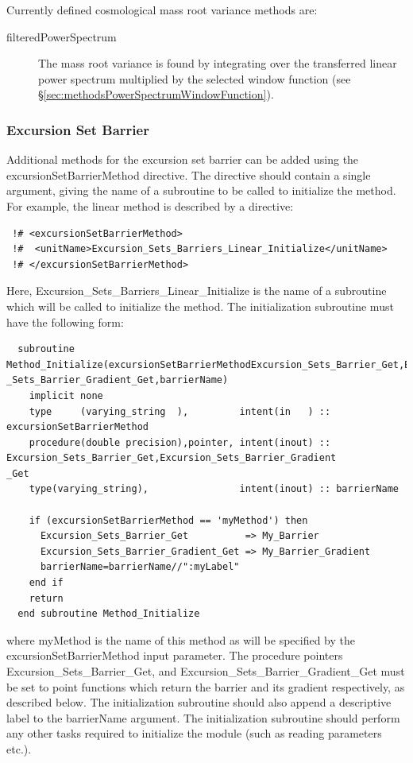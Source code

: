 Currently defined cosmological mass root variance methods are:
\begin{description}
 \item [{\normalfont \ttfamily filteredPowerSpectrum}] The mass root variance is found by integrating over the transferred linear power spectrum multiplied by the selected window function (see \S\ref{sec:methodsPowerSpectrumWindowFunction}).
\end{description}

\subsubsection{Excursion Set Barrier}\label{sec:excursionSetBarrierMethod}

Additional methods for the excursion set barrier can be added using the {\normalfont \ttfamily excursionSetBarrierMethod} directive. The directive should contain a single argument, giving the name of a subroutine to be called to initialize the method. For example, the {\normalfont \ttfamily linear} method is described by a directive:
\begin{verbatim}
 !# <excursionSetBarrierMethod>
 !#  <unitName>Excursion_Sets_Barriers_Linear_Initialize</unitName>
 !# </excursionSetBarrierMethod>
\end{verbatim}
Here, {\normalfont \ttfamily Excursion\_Sets\_Barriers\_Linear\_Initialize} is the name of a subroutine which will be called to initialize the method. The initialization subroutine must have the following form:
\begin{verbatim}
  subroutine Method_Initialize(excursionSetBarrierMethodExcursion_Sets_Barrier_Get,Excursion
_Sets_Barrier_Gradient_Get,barrierName)
    implicit none
    type     (varying_string  ),         intent(in   ) :: excursionSetBarrierMethod
    procedure(double precision),pointer, intent(inout) :: Excursion_Sets_Barrier_Get,Excursion_Sets_Barrier_Gradient
_Get
    type(varying_string),                intent(inout) :: barrierName

    if (excursionSetBarrierMethod == 'myMethod') then
      Excursion_Sets_Barrier_Get          => My_Barrier
      Excursion_Sets_Barrier_Gradient_Get => My_Barrier_Gradient
      barrierName=barrierName//":myLabel"
    end if
    return
  end subroutine Method_Initialize
\end{verbatim}
where {\normalfont \ttfamily myMethod} is the name of this method as will be specified by the {\normalfont \ttfamily excursionSetBarrierMethod} input parameter. The procedure pointers {\normalfont \ttfamily Excursion\_Sets\_Barrier\_Get}, and {\normalfont \ttfamily Excursion\_Sets\_Barrier\_Gradient\_Get} must be set to point functions which return the barrier and its gradient respectively, as described below. The initialization subroutine should also append a descriptive label to the {\normalfont \ttfamily barrierName} argument. The initialization subroutine should perform any other tasks required to initialize the module (such as reading parameters etc.).


